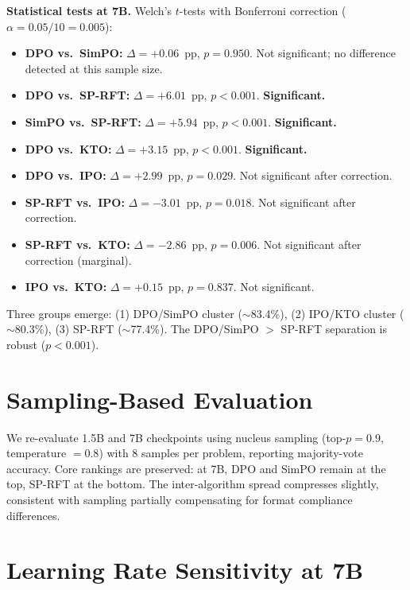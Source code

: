 \documentclass{article}
\newcommand{\sprft}{SP-RFT}
\begin{document}
\textbf{Statistical tests at 7B.}
Welch's $t$-tests with Bonferroni correction ($\alpha = 0.05 / 10 = 0.005$):
\begin{itemize}[leftmargin=*,itemsep=1pt]
    \item \textbf{DPO vs.\ SimPO:} $\Delta = +0.06$~pp, $p = 0.950$. Not significant; no difference detected at this sample size.
    \item \textbf{DPO vs.\ \sprft{}:} $\Delta = +6.01$~pp, $p < 0.001$. \textbf{Significant.}
    \item \textbf{SimPO vs.\ \sprft{}:} $\Delta = +5.94$~pp, $p < 0.001$. \textbf{Significant.}
    \item \textbf{DPO vs.\ KTO:} $\Delta = +3.15$~pp, $p < 0.001$. \textbf{Significant.}
    \item \textbf{DPO vs.\ IPO:} $\Delta = +2.99$~pp, $p = 0.029$. Not significant after correction.
    \item \textbf{\sprft{} vs.\ IPO:} $\Delta = -3.01$~pp, $p = 0.018$. Not significant after correction.
    \item \textbf{\sprft{} vs.\ KTO:} $\Delta = -2.86$~pp, $p = 0.006$. Not significant after correction (marginal).
    \item \textbf{IPO vs.\ KTO:} $\Delta = +0.15$~pp, $p = 0.837$. Not significant.
\end{itemize}

Three groups emerge: (1) DPO/SimPO cluster (${\sim}$83.4\%), (2) IPO/KTO cluster (${\sim}$80.3\%), (3) \sprft{} (${\sim}$77.4\%). The DPO/SimPO $>$ \sprft{} separation is robust ($p < 0.001$).

\section{Sampling-Based Evaluation}
\label{app:sampling_eval}

We re-evaluate 1.5B and 7B checkpoints using nucleus sampling (top-$p = 0.9$, temperature $= 0.8$) with 8 samples per problem, reporting majority-vote accuracy.
Core rankings are preserved: at 7B, DPO and SimPO remain at the top, \sprft{} at the bottom. The inter-algorithm spread compresses slightly, consistent with sampling partially compensating for format compliance differences.

\section{Learning Rate Sensitivity at 7B}
\label{app:lr_ablation}
\end{document}
